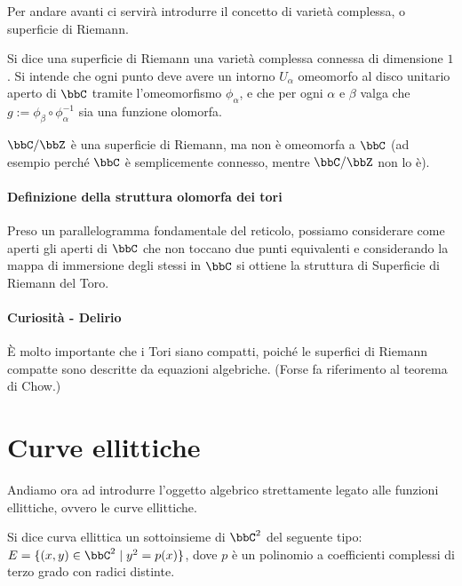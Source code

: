 Per andare avanti ci servirà introdurre il concetto di varietà complessa, o superficie di Riemann.
\begin{definizione}
  Si dice una superficie di Riemann una varietà complessa connessa di dimensione $1$.  Si intende che ogni punto deve avere un intorno $U_\alpha$ omeomorfo al disco unitario aperto di $\bbC$ tramite l'omeomorfismo $\phi_\alpha$, e che per ogni $\alpha$ e $\beta$ valga che $g := \phi_\beta \circ \phi_\alpha^{-1}$ sia una funzione olomorfa.
\end{definizione}

\begin{esempio}
  $\bbC / \bbZ$ è una superficie di Riemann, ma non è omeomorfa a $\bbC$ (ad esempio perché $\bbC$ è semplicemente connesso, mentre $\bbC / \bbZ$ non lo è).
\end{esempio}

\paragraph{Definizione della struttura olomorfa dei tori}
Preso un parallelogramma fondamentale del reticolo, possiamo considerare come aperti gli aperti di $\bbC$ che non toccano due punti equivalenti e considerando la mappa di immersione degli stessi in $\bbC$ si ottiene la struttura di Superficie di Riemann del Toro.


\paragraph{Curiosità - Delirio}
È molto importante che i Tori siano compatti, poiché le superfici di Riemann compatte sono descritte da equazioni algebriche. (Forse fa riferimento al teorema di Chow.)


\section{Curve ellittiche}
Andiamo ora ad introdurre l'oggetto algebrico strettamente legato alle funzioni ellittiche, ovvero le curve ellittiche.

\begin{definizione}
  Si dice curva ellittica un sottoinsieme di $\bbC^2$ del seguente tipo: $E = \{ (x,y) \in \bbC^2 \mid y^2 = p(x) \}$, dove $p$ è un polinomio a coefficienti complessi di terzo grado con radici distinte.
\end{definizione}

